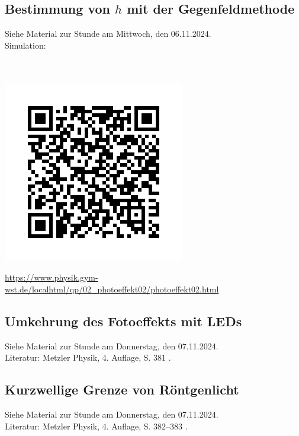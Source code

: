\documentclass[a4paper, 10pt]{scrbook}
\begin{document}
\subsection{Bestimmung von $h$ mit der Gegenfeldmethode}
Siehe Material zur Stunde am Mittwoch, den 06.11.2024.\\
Simulation:\\~\\
  \begin{minipage}[t]{.15\linewidth}
  ~\\\vspace{-1cm}
  \includegraphics[width=\linewidth]{images/gym-wst-QR}
 \end{minipage}
 \hfill
 \begin{minipage}[t]{.8\linewidth}
  \url{https://www.physik.gym-wst.de/localhtml/qp/02_photoeffekt02/photoeffekt02.html}\\
 \end{minipage}
\subsection{Umkehrung des Fotoeffekts mit LEDs}
Siehe Material zur Stunde am Donnerstag, den 07.11.2024.\\
Literatur: Metzler Physik, 4. Auflage, S. 381 \cite{Metzler2007}.
\subsection{Kurzwellige Grenze von Röntgenlicht}
Siehe Material zur Stunde am Donnerstag, den 07.11.2024.\\
Literatur: Metzler Physik, 4. Auflage, S. 382--383 \cite{Metzler2007}.
\end{document}
